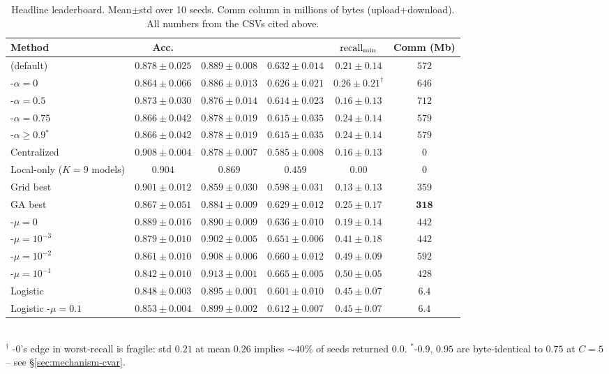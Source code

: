 \begin{table}[t]
\centering
\caption{Headline leaderboard. Mean$\pm$std over 10 seeds. Comm column in
millions of bytes (upload+download). All numbers from the CSVs cited above.}
\label{tab:headline}
\small
\begin{tabular}{lccccc}
\toprule
Method & Acc. & \auroc{} & \auprc{} & $\text{recall}_{\min}{}$ & Comm (Mb)\\
\midrule
\fedavg{} (default)        & $0.878\!\pm\!0.025$ & $0.889\!\pm\!0.008$ & $0.632\!\pm\!0.014$ & $0.21\!\pm\!0.14$ & $572$ \\
\cvar{}-$\alpha\!=\!0$      & $0.864\!\pm\!0.066$ & $0.886\!\pm\!0.013$ & $0.626\!\pm\!0.021$ & $\mathbf{0.26\!\pm\!0.21}^{\dagger}$ & $646$ \\
\cvar{}-$\alpha\!=\!0.5$    & $0.873\!\pm\!0.030$ & $0.876\!\pm\!0.014$ & $0.614\!\pm\!0.023$ & $0.16\!\pm\!0.13$ & $712$ \\
\cvar{}-$\alpha\!=\!0.75$   & $0.866\!\pm\!0.042$ & $0.878\!\pm\!0.019$ & $0.615\!\pm\!0.035$ & $0.24\!\pm\!0.14$ & $579$ \\
\cvar{}-$\alpha\!\geq\!0.9$$^*$ & $0.866\!\pm\!0.042$ & $0.878\!\pm\!0.019$ & $0.615\!\pm\!0.035$ & $0.24\!\pm\!0.14$ & $579$ \\
Centralized              & $\mathbf{0.908\!\pm\!0.004}$ & $0.878\!\pm\!0.007$ & $0.585\!\pm\!0.008$ & $0.16\!\pm\!0.13$ & $0$ \\
Local-only ($K=9$ models) & $0.904$ & $0.869$ & $0.459$ & $0.00$ & $0$ \\
Grid best                & $0.901\!\pm\!0.012$ & $0.859\!\pm\!0.030$ & $0.598\!\pm\!0.031$ & $0.13\!\pm\!0.13$ & $359$ \\
GA best                  & $0.867\!\pm\!0.051$ & $0.884\!\pm\!0.009$ & $0.629\!\pm\!0.012$ & $0.25\!\pm\!0.17$ & $\mathbf{318}$ \\
\midrule
\fedprox{}-$\mu\!=\!0$      & $0.889\!\pm\!0.016$ & $0.890\!\pm\!0.009$ & $0.636\!\pm\!0.010$ & $0.19\!\pm\!0.14$ & $442$ \\
\fedprox{}-$\mu\!=\!10^{-3}$ & $0.879\!\pm\!0.010$ & $0.902\!\pm\!0.005$ & $0.651\!\pm\!0.006$ & $0.41\!\pm\!0.18$ & $442$ \\
\fedprox{}-$\mu\!=\!10^{-2}$ & $0.861\!\pm\!0.010$ & $0.908\!\pm\!0.006$ & $0.660\!\pm\!0.012$ & $0.49\!\pm\!0.09$ & $592$ \\
\fedprox{}-$\mu\!=\!10^{-1}$ & $0.842\!\pm\!0.010$ & $\mathbf{0.913\!\pm\!0.001}$ & $\mathbf{0.665\!\pm\!0.005}$ & $\mathbf{0.50\!\pm\!0.05}$ & $428$ \\
\midrule
Logistic \fedavg{}        & $0.848\!\pm\!0.003$ & $0.895\!\pm\!0.001$ & $0.601\!\pm\!0.010$ & $0.45\!\pm\!0.07$ & $6.4$ \\
Logistic \fedprox{}-$\mu\!=\!0.1$ & $0.853\!\pm\!0.004$ & $0.899\!\pm\!0.002$ & $0.612\!\pm\!0.007$ & $0.45\!\pm\!0.07$ & $6.4$ \\
\bottomrule
\end{tabular}
\\[2pt]
\footnotesize
$^{\dagger}$ \cvar{}-$0$'s edge in worst-recall is fragile: std $0.21$ at mean $0.26$ implies $\sim40\%$ of seeds returned $0.0$.\quad
$^*$\cvar{}-$0.9$, $0.95$ are byte-identical to $0.75$ at $C\!=\!5$ -- see \S\ref{sec:mechanism-cvar}.
\end{table}

